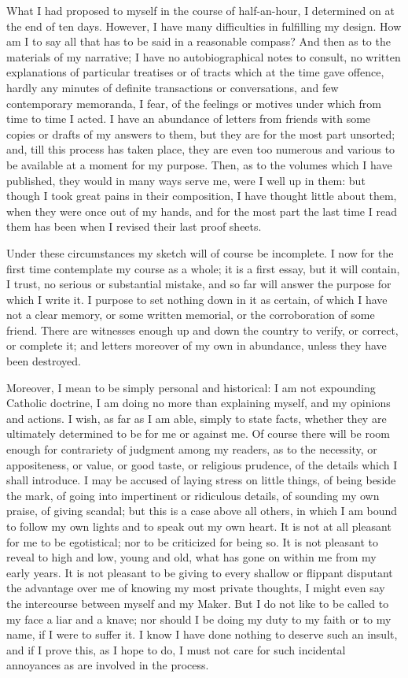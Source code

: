 What I had proposed to myself in the course of half-an-hour, I
determined on at the end of ten days. However, I have many
difficulties in fulfilling my design. How am I to say all that has to
be said in a reasonable compass? And then as to the materials of my
narrative; I have no autobiographical notes to consult, no written
explanations of particular treatises or of tracts which at the time
gave offence, hardly any minutes of definite transactions or
conversations, and few contemporary memoranda, I fear, of the feelings
or motives under which from time to time I acted. I have an abundance
of letters from friends with some copies or drafts of my answers to
them, but they are for the most part unsorted; and, till this process
has taken place, they are even too numerous and various to be
available at a moment for my purpose. Then, as to the volumes which I
have published, they would in many ways serve me, were I well up in
them: but though I took great pains in their composition, I have
thought little about them, when they were once out of my hands, and for the most
part the last time
I read them has been when I revised their last proof sheets.

Under these circumstances my sketch will of course be incomplete. I
now for the first time contemplate my course as a whole; it is a first
essay, but it will contain, I trust, no serious or substantial
mistake, and so far will answer the purpose for which I write it. I
purpose to set nothing down in it as certain, of which I have not a
clear memory, or some written memorial, or the corroboration of some
friend. There are witnesses enough up and down the country to verify,
or correct, or complete it; and letters moreover of my own in
abundance, unless they have been destroyed.

Moreover, I mean to be simply personal and historical: I am not
expounding Catholic doctrine, I am doing no more than explaining
myself, and my opinions and actions. I wish, as far as I am able,
simply to state facts, whether they are ultimately determined to be
for me or against me. Of course there will be room enough for
contrariety of judgment among my readers, as to the necessity, or
appositeness, or value, or good taste, or religious prudence,
of the details which I shall introduce. I may be accused of laying
stress on little things, of being beside the mark, of going into
impertinent or ridiculous details, of sounding my own praise, of
giving scandal; but this is a case above all others, in which I am
bound to follow my own lights and to speak out my own heart. It is not
at all pleasant for me to be egotistical; nor to be criticized for
being so. It is not pleasant to reveal to high and low, young and old,
what has gone on within me from my early years. It is not pleasant to
be giving to every shallow or flippant disputant the advantage over me
of knowing my most private thoughts, I might even say the intercourse
between myself and my Maker. But I do not like to be called to my face
a liar and a knave; nor should I be doing my duty to my faith or to my
name, if I were to suffer it. I know I have done nothing to deserve
such an insult, and if I prove this, as I hope to do, I must not care
for such incidental annoyances as are involved in the process.

